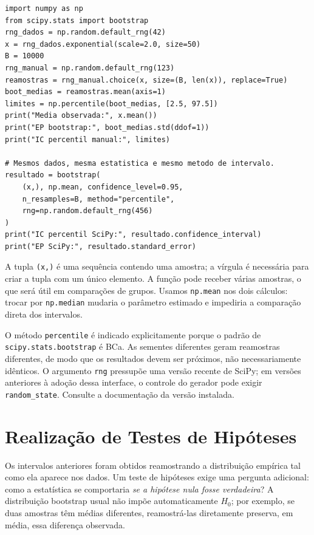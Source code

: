 \documentclass[12pt,a4paper]{article}
\begin{document}
\begin{lstlisting}[caption={Intervalo percentil manual para a media.},label={lst:ic-bootstrap}]
import numpy as np
from scipy.stats import bootstrap
rng_dados = np.random.default_rng(42)
x = rng_dados.exponential(scale=2.0, size=50)
B = 10000
rng_manual = np.random.default_rng(123)
reamostras = rng_manual.choice(x, size=(B, len(x)), replace=True)
boot_medias = reamostras.mean(axis=1)
limites = np.percentile(boot_medias, [2.5, 97.5])
print("Media observada:", x.mean())
print("EP bootstrap:", boot_medias.std(ddof=1))
print("IC percentil manual:", limites)

# Mesmos dados, mesma estatistica e mesmo metodo de intervalo.
resultado = bootstrap(
    (x,), np.mean, confidence_level=0.95,
    n_resamples=B, method="percentile",
    rng=np.random.default_rng(456)
)
print("IC percentil SciPy:", resultado.confidence_interval)
print("EP SciPy:", resultado.standard_error)
\end{lstlisting}
A tupla \texttt{(x,)} é uma sequência contendo uma amostra; a vírgula é necessária para criar a tupla com um único elemento. A função pode receber várias amostras, o que será útil em comparações de grupos. Usamos \texttt{np.mean} nos dois cálculos: trocar por \texttt{np.median} mudaria o parâmetro estimado e impediria a comparação direta dos intervalos.

O método \texttt{percentile} é indicado explicitamente porque o padrão de \texttt{scipy.stats.}\allowbreak\texttt{bootstrap} é BCa. As sementes diferentes geram reamostras diferentes, de modo que os resultados devem ser próximos, não necessariamente idênticos. O argumento \texttt{rng} pressupõe uma versão recente de SciPy; em versões anteriores à adoção dessa interface, o controle do gerador pode exigir \texttt{random\_state}. Consulte a documentação da versão instalada.

\section{Realização de Testes de Hipóteses}
\label{sec:teste}
Os intervalos anteriores foram obtidos reamostrando a distribuição empírica tal como ela aparece nos dados. Um teste de hipóteses exige uma pergunta adicional: como a estatística se comportaria \emph{se a hipótese nula fosse verdadeira}? A distribuição bootstrap usual não impõe automaticamente $H_0$; por exemplo, se duas amostras têm médias diferentes, reamostrá-las diretamente preserva, em média, essa diferença observada.
\end{document}
